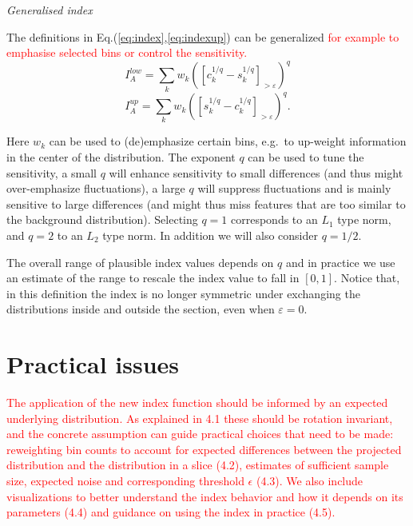 \documentclass[]{interact}
\theoremstyle{plain}%
\theoremstyle{definition}
\theoremstyle{remark}
\begin{document}
\emph{Generalised index}

The definitions in Eq.(\ref{eq:index},\ref{eq:indexup}) can be
generalized
\textcolor{red}{for example to emphasise selected bins or control the sensitivity.}
\begin{equation}
I_A^{low} = \sum_{k}w_{k}\left(\left[c_{k}^{1/q}-s_{k}^{1/q}\right]_{>\varepsilon}\right)^{q}
\label{eq:index2}
\end{equation} \begin{equation}
I_A^{up} = \sum_{k}w_{k}\left(\left[s_{k}^{1/q}-c_{k}^{1/q}\right]_{>\varepsilon}\right)^{q}.
\label{eq:index2up}
\end{equation}

Here \(w_k\) can be used to (de)emphasize certain bins, e.g.~to
up-weight information in the center of the distribution. The exponent
\(q\) can be used to tune the sensitivity, a small \(q\) will enhance
sensitivity to small differences (and thus might over-emphasize
fluctuations), a large \(q\) will suppress fluctuations and is mainly
sensitive to large differences (and might thus miss features that are
too similar to the background distribution). Selecting \(q=1\)
corresponds to an \(L_1\) type norm, and \(q=2\) to an \(L_2\) type
norm. In addition we will also consider \(q=1/2\).

The overall range of plausible index values depends on \(q\) and in
practice we use an estimate of the range to rescale the index value to
fall in \([0,1]\). Notice that, in this definition the index is no
longer symmetric under exchanging the distributions inside and outside
the section, even when \(\varepsilon=0\).

\hypertarget{practical-issues}{%
\section{Practical issues}\label{practical-issues}}

\textcolor{red}{
The application of the new index function should be informed by an expected underlying distribution. As explained in 4.1 these should be rotation invariant, and the concrete assumption can guide practical choices that need to be made: reweighting bin counts to account for expected differences between the projected distribution and the distribution in a slice (4.2), estimates of sufficient sample size, expected noise and corresponding threshold $\epsilon$ (4.3).
We also include visualizations to better understand the index behavior and how it depends on its parameters (4.4) and guidance on using the index in practice (4.5).
}
\end{document}
